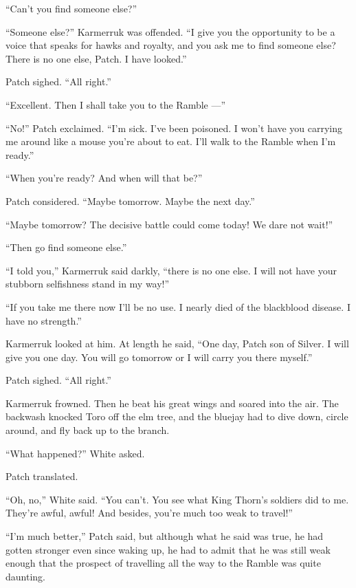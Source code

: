 \documentclass[ebook,oneside,openany,17pt]{memoir}
\newenvironment{tolerant}[1]{%
  \par\tolerance=#1\relax
}{%
  \par
}
\begin{document}
“Can’t you find someone else?”

“Someone else?” Karmerruk was offended. “I give you the opportunity to
be a voice that speaks for hawks and royalty, and you ask me to find
someone else? There is no one else, Patch. I have looked.”

Patch sighed. “All right.”

“Excellent. Then I shall take you to the Ramble —”

“No!” Patch exclaimed. “I’m sick. I’ve been poisoned. I won’t have you
carrying me around like a mouse you’re about to eat. I’ll walk to the
Ramble when I’m ready.”

“When you’re ready? And when will that be?”

Patch considered. “Maybe tomorrow. Maybe the next day.”

\begin{tolerant}{1000}
“Maybe tomorrow? The decisive battle could come today! We dare not
wait!”
\end{tolerant}

“Then go find someone else.”

“I told you,” Karmerruk said darkly, “there is no one else. I will not
have your stubborn selfishness stand in my way!”

“If you take me there now I’ll be no use. I nearly died of the
blackblood disease. I have no strength.”

\begin{tolerant}{1000}
Karmerruk looked at him. At length he said, “One day, Patch son of
Silver. I will give you one day. You will go tomorrow or I will carry
you there myself.”
\end{tolerant}

Patch sighed. “All right.”

Karmerruk frowned. Then he beat his great wings and soared into the
air. The backwash knocked Toro off the elm tree, and the bluejay had
to dive down, circle around, and fly back up to the branch.

“What happened?” White asked.

Patch translated.

“Oh, no,” White said. “You can’t. You see what King Thorn’s soldiers
did to me. They’re awful, awful! And besides, you’re much too weak to
travel!”

“I’m much better,” Patch said, but although what he said was true, he
had gotten stronger even since waking up, he had to admit that he was
still weak enough that the prospect of travelling all the way to the
Ramble was quite daunting.
\end{document}
